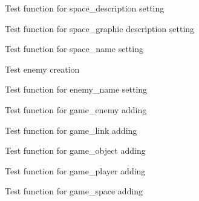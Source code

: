 \begin{DoxyRefList}
Test function for space\+\_\+description setting  
\item[Member \mbox{\hyperlink{space__test_8h_a068c22b91236896ae1b077a8f7059458}{test1\+\_\+space\+\_\+set\+\_\+gdesc}} ()]\label{test__test000110}%
%
Test function for space\+\_\+graphic description setting  
\item[Member \mbox{\hyperlink{space__test_8h_a2569bab6cfeec15f722d232bb8c78c9e}{test1\+\_\+space\+\_\+set\+\_\+name}} ()]\label{test__test000107}%
%
Test function for space\+\_\+name setting  
\item[Member \mbox{\hyperlink{enemy__test_8h_ac000e90fe96bb0662f207e75f824a995}{test2\+\_\+enemy\+\_\+create}} ()]\label{test__test000002}%
%
Test enemy creation  
\item[Member \mbox{\hyperlink{enemy__test_8h_a112a33a8bdf4808b0725cc8c9f240de1}{test2\+\_\+enemy\+\_\+set\+\_\+name}} ()]\label{test__test000004}%
%
Test function for enemy\+\_\+name setting  
\item[Member \mbox{\hyperlink{game__test_8h_a0ba0b6af40ca4cc45686acac19a849c4}{test2\+\_\+game\+\_\+add\+\_\+enemy}} ()]\label{test__test000026}%
%
Test function for game\+\_\+enemy adding  
\item[Member \mbox{\hyperlink{game__test_8h_af5c4dd79b2a7b67adbeeb8df5791a5de}{test2\+\_\+game\+\_\+add\+\_\+link}} ()]\label{test__test000028}%
%
Test function for game\+\_\+link adding  
\item[Member \mbox{\hyperlink{game__test_8h_ab996895e69c5d41fab5515e88aed3975}{test2\+\_\+game\+\_\+add\+\_\+object}} ()]\label{test__test000018}%
%
Test function for game\+\_\+object adding  
\item[Member \mbox{\hyperlink{game__test_8h_a42bb53c500bf8ae4dce0e144a85cd80b}{test2\+\_\+game\+\_\+add\+\_\+player}} ()]\label{test__test000024}%
%
Test function for game\+\_\+player adding  
\item[Member \mbox{\hyperlink{game__test_8h_aed0f40f3ab1c252e548b038542d7409d}{test2\+\_\+game\+\_\+add\+\_\+space}} ()]\label{test__test000016}%
%
Test function for game\+\_\+space adding  
\item[Member \mbox{\hyperlink{game__test_8h_a470cfbf8141add43010f03bf884af802}{test2\+\_\+game\+\_\+get\+\_\+connection}} ()]\label{test__test000032}%
%

\end{DoxyRefList}
